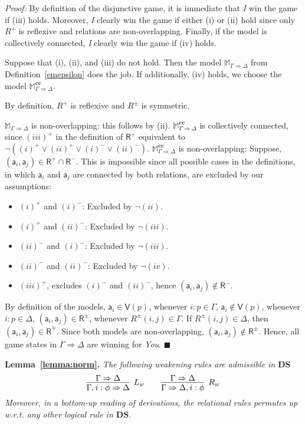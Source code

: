 \documentclass{easychair}
\newcommand{\I}{\emph{I}\xspace}
\newcommand{\You}{\emph{You}\xspace}
\newcommand{\DS}{\mathbf{DS}}
\newcommand{\seq}{\Rightarrow}
\newcommand{\M}{\mathbb{M}}
\newcommand{\R}{\mathsf{R}}
\newcommand{\V}{\mathsf{V}}
\newcommand{\ag}{\mathsf{a}}
\renewcommand{\qed}{\hfill$\blacksquare$}
\renewenvironment{proof}{\noindent\textit{Proof:}\quad}{\qed}
\newcommand{\cc}{\textbf{cc}}
\begin{document}
\begin{proof}
By definition of the disjunctive game, it is immediate that \I win the game if (iii) holds. Moreover,
\I clearly win the game if either (i) or (ii) hold since only $R^+$ is
reflexive and relations are non-overlapping. Finally, if the model is collectively connected, \I clearly win the game if (iv) holds.

Suppose that (i), (ii), and (iii) do not hold. Then the model $\M_{\Gamma \Rightarrow \Delta}$ from Definition~\ref{emepsilon} does the job. If additionally, (iv) holds, we choose the model $\M_{\Gamma \Rightarrow \Delta}^\cc$.

By definition, $R^+$ is reflexive and $R^\pm$ is symmetric. 


$\M_{\Gamma \Rightarrow \Delta}$ is non-overlapping: this follows by (ii). $\M_{\Gamma\Rightarrow \Delta}^\cc$ is collectively connected, since  $(iii)^+$ in the definition of $\R^+$ equivalent to $\neg((i)^+\vee (ii)^+\vee (i)^-\vee (ii)^-)$. $\M^\cc_{\Gamma \Rightarrow \Delta}$ is non-overlapping:  Suppose, $(\ag_i,\ag_j)\in \R^+\cap \R^-$. This is impossible since all possible cases in the definitions, in which $\ag_i$ and $\ag_j$ are connected by both relations, are excluded by our assumptions:
 
\begin{itemize}
    \item   $(i)^+$ and $(i)^-$: Excluded by $\neg(ii)$.
    \item $(i)^+$ and $(ii)^-$: Excluded by $\neg (iii)$.
    \item $(ii)^-$ and $(i)^-$: Excluded by $\neg (iii)$.
    \item $(ii)^-$ and $(ii)^-$: Excluded by $\neg (iv)$.
    \item $(iii)^+$, excludes $(i)^-$ and $(ii)^-$, hence $(\ag_i,\ag_j)\notin \R^-$.
\end{itemize}

By definition of the models, $\ag_i\in \V(p)$, whenever $i:p\in \Gamma$, $\ag_i\notin \V(p)$, whenever $i:p\in \Delta$, $(\ag_i, \ag_j)\in \R^\pm$, whenever $R^\pm(i,j)\in \Gamma$. If $R^\pm(i,j)\in \Delta$, then $(\ag_i,\ag_j)\in \R^\mp$. Since both models are non-overlapping, $(\ag_i,\ag_j)\notin \R^\pm$. Hence, all game states in $\Gamma \Rightarrow \Delta$ are winning for \You.
\end{proof}


\bigskip

\noindent
{\bf Lemma~\ref{lemma:norm}.}
\textit{  
The following weakening rules are admissible in $\DS$
\[
\infer[L_w]{\Gamma,i:\phi\seq\Delta}{\Gamma\seq\Delta} \qquad \infer[R_w]{\Gamma\seq\Delta,i:\phi}{\Gamma\seq\Delta}
\]
Moreover, in a bottom-up reading of derivations, the relational rules permutes up w.r.t. any other logical rule in $\DS$.
}
\end{document}
